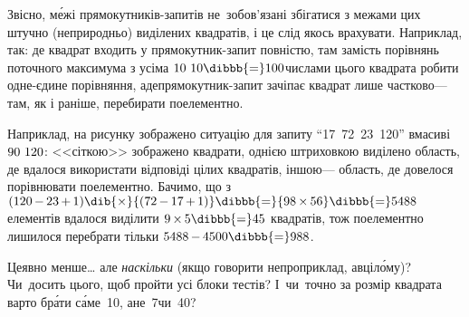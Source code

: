Звісно, м\'{е}жі прямокутників-запитів не~зобов'язані збігатися з межами цих штучно (непри\-род\-ньо) виділених квадратів, і це слід якось врахувати. Наприклад, так: де квадрат входить у прямокутник-запит повністю, там замість порівнянь поточного максимума з усіма ${10\,{\*}\,10}\dibbb{{=}}100$\nolinebreak[2] числами цього квадрата робити одне-єдине порівняння, а\nolinebreak[3] де\nolinebreak[3] прямокутник-запит зачіпає квадрат лише частково\nolinebreak[3] --- там, як і раніше, перебирати поелементно. 

Наприклад, на рисунку зображено ситуацію для запиту ``17~72~23~120'' в\nolinebreak[3] масиві\nolinebreak[2] $90\,{\*}\,120$: <<сіткою>> зображено квадрати, однією штриховкою виділено область, де вдалося використати відповіді цілих квадратів, іншою\nolinebreak[3] --- область, де довелося порівнювати поелементно. 
%
Бачимо, що з ${(120\,{-}\,23\,{+}\,1)}\dib{{\times}}{(72\,{-}\,17\,{+}\,1)}\dibbb{{=}}{98\,{\times}\,56}\dibbb{{=}}5488$ елементів вдалося виділити ${9\,{\times}\,5}\dibbb{{=}}45$ квадратів, тож поелементно лишилося перебрати тільки ${5488\,{-}\,4500}\dibbb{{=}}988$.

Це\nolinebreak[3] явно менше\dots{} але \emph{наскільки} (якщо говорити не\nolinebreak[3] про\nolinebreak[3] приклад, а\nolinebreak[3] в\nolinebreak[3] ціл\'{о}му)? Чи~досить цього, щоб пройти усі блоки тестів? І~чи~точно за розмір квадрата варто бр\'{а}ти с\'{а}ме~10, а\nolinebreak[3] не~7\nolinebreak[3] чи~40?


